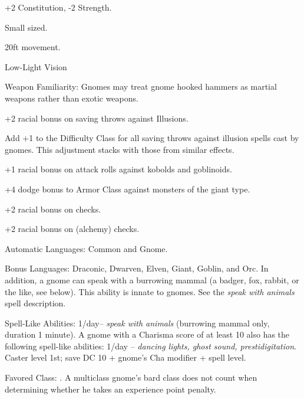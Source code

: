 
\begin{itemize*}
\item +2 Constitution, -2 Strength.
\item Small sized.
\item 20ft movement.
\item Low-Light Vision
\item Weapon Familiarity: Gnomes may treat gnome hooked hammers as martial weapons rather than exotic weapons.
\item +2 racial bonus on saving throws against Illusions.
\item Add +1 to the Difficulty Class for all saving throws against illusion spells cast by gnomes. This adjustment stacks with those from similar effects.
\item +1 racial bonus on attack rolls against kobolds and goblinoids.
\item +4 dodge bonus to Armor Class against monsters of the giant type.
\item +2 racial bonus on  checks.
\item +2 racial bonus on  (alchemy) checks.
\item Automatic Languages: Common and Gnome.
\item Bonus Languages: Draconic, Dwarven, Elven, Giant, Goblin, and Orc. In addition, a gnome can speak with a burrowing mammal (a badger, fox, rabbit, or the like, see below). This ability is innate to gnomes. See the \textit{speak with animals} spell description.
\item Spell-Like Abilities: 1/day-- \textit{speak with animals} (burrowing mammal only, duration 1 minute). A gnome with a Charisma score of at least 10 also has the following spell-like abilities: 1/day -- \textit{dancing lights, ghost sound, prestidigitation}. Caster level 1st; save DC 10 + gnome's Cha modifier + spell level.
\item Favored Class: . A multiclass gnome's bard class does not count when determining whether he takes an experience point penalty.
\end{itemize*}
